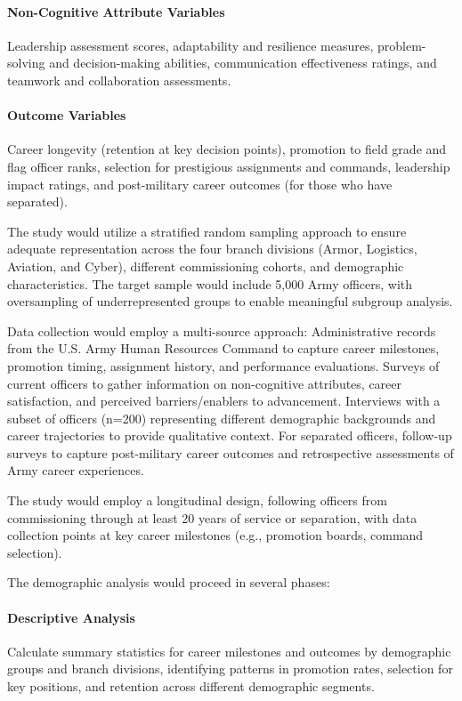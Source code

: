 \documentclass[../main.tex]{subfiles}
\begin{document}
\paragraph{Non-Cognitive Attribute Variables} Leadership assessment scores, adaptability and resilience measures, problem-solving and decision-making abilities, communication effectiveness ratings, and teamwork and collaboration assessments.

\paragraph{Outcome Variables} Career longevity (retention at key decision points), promotion to field grade and flag officer ranks, selection for prestigious assignments and commands, leadership impact ratings, and post-military career outcomes (for those who have separated).


 The study would utilize a stratified random sampling approach to ensure adequate representation across the four branch divisions (Armor, Logistics, Aviation, and Cyber), different commissioning cohorts, and demographic characteristics. The target sample would include 5,000 Army officers, with oversampling of underrepresented groups to enable meaningful subgroup analysis.

 Data collection would employ a multi-source approach: Administrative records from the U.S. Army Human Resources Command to capture career milestones, promotion timing, assignment history, and performance evaluations. Surveys of current officers to gather information on non-cognitive attributes, career satisfaction, and perceived barriers/enablers to advancement. Interviews with a subset of officers (n=200) representing different demographic backgrounds and career trajectories to provide qualitative context. For separated officers, follow-up surveys to capture post-military career outcomes and retrospective assessments of Army career experiences.

 The study would employ a longitudinal design, following officers from commissioning through at least 20 years of service or separation, with data collection points at key career milestones (e.g., promotion boards, command selection).


 The demographic analysis would proceed in several phases:

\paragraph{Descriptive Analysis} Calculate summary statistics for career milestones and outcomes by demographic groups and branch divisions, identifying patterns in promotion rates, selection for key positions, and retention across different demographic segments.
\end{document}
